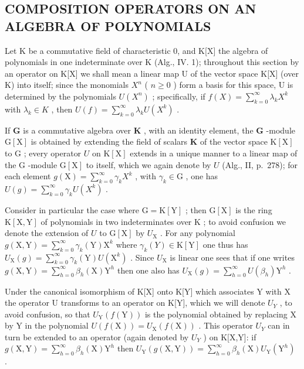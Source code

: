 \subsection{COMPOSITION OPERATORS ON AN ALGEBRA OF POLYNOMIALS}

Let K be a commutative field of characteristic 0, and K{[}X{]} the algebra of polynomials in one indeterminate over K (Alg., IV. 1); throughout this section by an operator on K{[}X{]} we shall mean a linear map U of the vector space K{[}X{]} (over K) into itself; since the monomials \(X^{n}\) ( \(n \geqslant 0\) ) form a basis for this space, U is determined by the polynomials \(U(X^{n})\) ; specifically, if \(f(X) = \sum_{k=0}^{\infty} \lambda_{k} X^{k}\) with \(\lambda_{k} \in K\) , then \(U(f) = \sum_{k=0}^{\infty} \lambda_{k} U(X^{k})\) .

If \(\mathbf{G}\) is a commutative algebra over \(\mathbf{K}\) , with an identity element, the \(\mathbf{G}\) -module \(\mathrm{G}[\mathrm{X}]\) is obtained by extending the field of scalars \(\mathbf{K}\) of the vector space \(\mathrm{K}[\mathrm{X}]\) to \(\mathrm{G}\) ; every operator \(U\) on \(\mathrm{K}[\mathrm{X}]\) extends in a unique manner to a linear map of the \(\mathrm{G}\) -module \(\mathrm{G}[\mathrm{X}]\) to itself, which we again denote by \(U\) (Alg., II, p.~278); for each element \(g(\mathrm{X}) = \sum_{k=0}^{\infty} \gamma_k X^k\) , with \(\gamma_k \in \mathrm{G}\) , one has \(U(g) = \sum_{k=0}^{\infty} \gamma_k U(X^k)\) .

Consider in particular the case where \(\mathrm{G} = \mathrm{K}[\mathrm{Y}]\) ; then \(\mathrm{G}[\mathrm{X}]\) is the ring \(\mathrm{K}[\mathrm{X},\mathrm{Y}]\) of polynomials in two indeterminates over \(\mathrm{K}\) ; to avoid confusion we denote the extension of \(U\) to \(\mathrm{G}[\mathrm{X}]\) by \(U_{\mathrm{X}}\) . For any polynomial \(g(\mathrm{X},\mathrm{Y}) = \sum_{k=0}^{\infty}\gamma_k(\mathrm{Y})\mathrm{X}^k\) where \(\gamma_k(Y)\in \mathrm{K}[\mathrm{Y}]\) one thus has \(U_{\mathrm{X}}(g) = \sum_{k=0}^{\infty}\gamma_k(\mathrm{Y})U(\mathrm{X}^k)\) . Since \(U_{\mathrm{X}}\) is linear one sees that if one writes \(g(\mathrm{X},\mathrm{Y}) = \sum_{h=0}^{\infty}\beta_h(\mathrm{X})\mathrm{Y}^h\) then one also has \(U_{\mathrm{X}}(g) = \sum_{h=0}^{\infty}U(\beta_h)\mathrm{Y}^h\) .

Under the canonical isomorphism of K{[}X{]} onto K{[}Y{]} which associates Y with X the operator U transforms to an operator on K{[}Y{]}, which we will denote \(U_{Y}\) , to avoid confusion, so that \(U_{\mathrm{Y}}(f(\mathrm{Y}))\) is the polynomial obtained by replacing X by Y in the polynomial \(U(f(\mathrm{X})) = U_{\mathrm{X}}(f(\mathrm{X}))\) . This operator \(U_{Y}\) can in turn be extended to an operator (again denoted by \(U_{Y}\) ) on K{[}X,Y{]}: if \(g(\mathrm{X}, \mathrm{Y}) = \sum_{h=0}^{\infty} \beta_{h}(\mathrm{X}) \mathrm{Y}^{h}\) then \(U_{\mathrm{Y}}(g(\mathrm{X}, \mathrm{Y})) = \sum_{h=0}^{\infty} \beta_{h}(\mathrm{X}) U_{\mathrm{Y}}(\mathrm{Y}^{h})\) .

